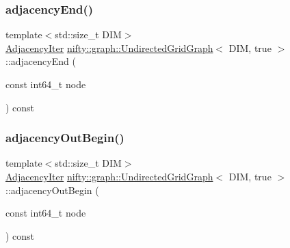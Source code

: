 \mbox{\label{classnifty_1_1graph_1_1UndirectedGridGraph_3_01DIM_00_01true_01_4_a2cd326774c5b5656af52a2e1690f3546}} 
\subsubsection{\texorpdfstring{adjacency\+End()}{adjacencyEnd()}}
{\footnotesize\ttfamily template$<$std\+::size\+\_\+t D\+IM$>$ \\
\hyperlink{classnifty_1_1graph_1_1UndirectedGridGraph_3_01DIM_00_01true_01_4_a9779969eb8762908d43eab3d9d3b17b1}{Adjacency\+Iter} \hyperlink{classnifty_1_1graph_1_1UndirectedGridGraph}{nifty\+::graph\+::\+Undirected\+Grid\+Graph}$<$ D\+IM, true $>$\+::adjacency\+End (\begin{DoxyParamCaption}\item[{const int64\+\_\+t}]{node }\end{DoxyParamCaption}) const\hspace{0.3cm}{\ttfamily [inline]}}

\mbox{\label{classnifty_1_1graph_1_1UndirectedGridGraph_3_01DIM_00_01true_01_4_af0463bdc61a84d1120556d53f8740c1b}} 
\subsubsection{\texorpdfstring{adjacency\+Out\+Begin()}{adjacencyOutBegin()}}
{\footnotesize\ttfamily template$<$std\+::size\+\_\+t D\+IM$>$ \\
\hyperlink{classnifty_1_1graph_1_1UndirectedGridGraph_3_01DIM_00_01true_01_4_a9779969eb8762908d43eab3d9d3b17b1}{Adjacency\+Iter} \hyperlink{classnifty_1_1graph_1_1UndirectedGridGraph}{nifty\+::graph\+::\+Undirected\+Grid\+Graph}$<$ D\+IM, true $>$\+::adjacency\+Out\+Begin (\begin{DoxyParamCaption}\item[{const int64\+\_\+t}]{node }\end{DoxyParamCaption}) const\hspace{0.3cm}{\ttfamily [inline]}}

